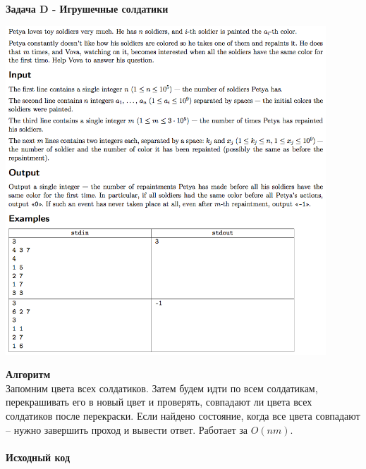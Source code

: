 \documentclass[a4paper,12pt]{article}
\begin{document}
\textbf{{\large Задача D - Игрушечные солдатики}} \\
\begin{center}
\includegraphics[width=0.9\textwidth]{CT_SGAU/CT_SGAU_D.png}\\ [1cm]
\end{center}
\textbf{{\large Алгоритм}} \\
Запомним цвета всех солдатиков. Затем будем идти по всем солдатикам, перекрашивать его в новый цвет и проверять, совпадают ли цвета всех солдатиков после перекраски. Если найдено состояние, когда все цвета совпадают -- нужно завершить проход и вывести ответ. Работает за $O(nm)$.\\ 
\\
\newpage
\textbf{{\large Исходный код}}
\end{document}
